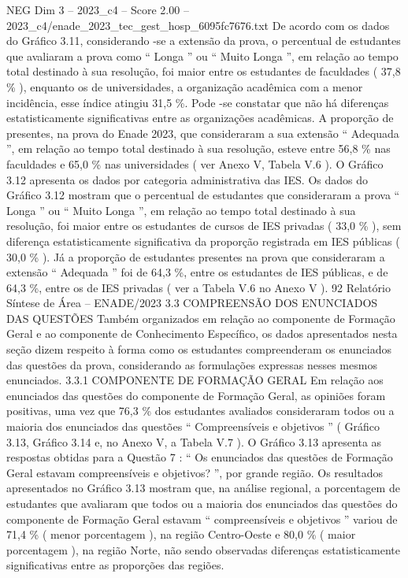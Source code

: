 \begin{textsample}{NEG Dim 3 – 2023\_c4 – Score 2.00 – 2023\_c4/enade\_2023\_tec\_gest\_hosp\_6095fc7676.txt}
De acordo com os dados do Gráfico 3.11, considerando -se a extensão da prova, o percentual de estudantes que avaliaram a prova como “ Longa ” ou “ Muito Longa ”, em relação ao tempo total destinado à sua resolução, foi maior entre os estudantes de faculdades ( 37,8 \% ), enquanto os de universidades, a organização acadêmica com a menor incidência, esse índice atingiu 31,5 \%.
Pode -se constatar que não há diferenças estatisticamente significativas entre as organizações acadêmicas.
A proporção de presentes, na prova do Enade 2023, que consideraram a sua extensão “ Adequada ”, em relação ao tempo total destinado à sua resolução, esteve entre 56,8 \% nas faculdades e 65,0 \% nas universidades ( ver Anexo V, Tabela V.6 ).
O Gráfico 3.12 apresenta os dados por categoria administrativa das IES.
Os dados do Gráfico 3.12 mostram que o percentual de estudantes que consideraram a prova “ Longa ” ou “ Muito Longa ”, em relação ao tempo total destinado à sua resolução, foi maior entre os estudantes de cursos de IES privadas ( 33,0 \% ), sem diferença estatisticamente significativa da proporção registrada em IES públicas ( 30,0 \% ).
Já a proporção de estudantes presentes na prova que consideraram a extensão “ Adequada ” foi de 64,3 \%, entre os estudantes de IES públicas, e de 64,3 \%, entre os de IES privadas ( ver a Tabela V.6 no Anexo V ). 92 Relatório Síntese de Área – ENADE/2023 3.3 COMPREENSÃO DOS ENUNCIADOS DAS QUESTÕES Também organizados em relação ao componente de Formação Geral e ao componente de Conhecimento Específico, os dados apresentados nesta seção dizem respeito à forma como os estudantes compreenderam os enunciados das questões da prova, considerando as formulações expressas nesses mesmos enunciados. 3.3.1 COMPONENTE DE FORMAÇÃO GERAL Em relação aos enunciados das questões do componente de Formação Geral, as opiniões foram positivas, uma vez que 76,3 \% dos estudantes avaliados consideraram todos ou a maioria dos enunciados das questões “ Compreensíveis e objetivos ” ( Gráfico 3.13, Gráfico 3.14 e, no Anexo V, a Tabela V.7 ).
O Gráfico 3.13 apresenta as respostas obtidas para a Questão 7 : “ Os enunciados das questões de Formação Geral estavam compreensíveis e objetivos? ”, por grande região.
Os resultados apresentados no Gráfico 3.13 mostram que, na análise regional, a porcentagem de estudantes que avaliaram que todos ou a maioria dos enunciados das questões do componente de Formação Geral estavam “ compreensíveis e objetivos ” variou de 71,4 \% ( menor porcentagem ), na região Centro-Oeste e 80,0 \% ( maior porcentagem ), na região Norte, não sendo observadas diferenças estatisticamente significativas entre as proporções das regiões.

\end{textsample}
